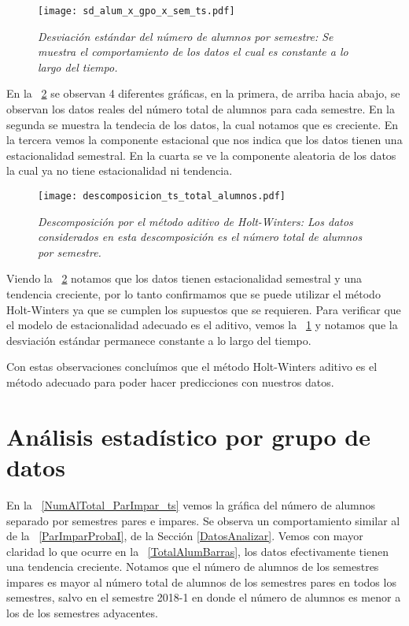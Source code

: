 \begin{figure}[H]
\centering
\texttt{[image: sd\_alum\_x\_gpo\_x\_sem\_ts.pdf]} %
\caption[\textit{Desviación estándar del número de alumnos por semestre}]{\textit{Desviación estándar del número de alumnos por semestre: Se muestra el comportamiento de los datos el cual es constante a lo largo del tiempo.}}\label{sd_alum_x_gpo_x_sem_ts}
\end{figure}

En la \figurename{~\ref{img_en_ing_2}} se observan 4 diferentes gráficas, en la primera, de arriba hacia abajo, se observan los datos reales del número total de alumnos para cada semestre. En la segunda se muestra la tendecia de los datos, la cual notamos que es creciente. En la tercera vemos la componente estacional que nos indica que los datos tienen una estacionalidad semestral. En la cuarta se ve la componente aleatoria de los datos la cual ya no tiene estacionalidad ni tendencia.

\begin{figure}[H]
\centering
\texttt{[image: descomposicion\_ts\_total\_alumnos.pdf]} %
\caption[\textit{Descomposición por el método aditivo de Holt-Winters}]{\textit{Descomposición por el método aditivo de Holt-Winters: Los datos considerados en esta descomposición es el número total de alumnos por semestre.}}\label{img_en_ing_2}
\end{figure}

Viendo la \figurename{~\ref{img_en_ing_2}} notamos que los datos tienen estacionalidad semestral y una tendencia creciente, por lo tanto confirmamos que se puede utilizar el método Holt-Winters ya que se cumplen los supuestos que se requieren. Para verificar que el modelo de estacionalidad adecuado es el aditivo, vemos la \figurename{~\ref{sd_alum_x_gpo_x_sem_ts}} y notamos que la desviación estándar permanece constante a lo largo del tiempo.

Con estas observaciones concluímos que el método Holt-Winters aditivo es el método adecuado para poder hacer predicciones con nuestros datos.

\section{Análisis estadístico por grupo de datos} \label{AE_x_GpoDeDatos}

En la \figurename{~\ref{NumAlTotal_ParImpar_ts}} vemos la gráfica del número de alumnos separado por semestres pares e impares. Se observa un comportamiento similar al de la \figurename{~\ref{ParImparProbaI}}, de la Sección \ref{DatosAnalizar}. Vemos con mayor claridad lo que ocurre en la \figurename{~\ref{TotalAlumBarras}}, los datos efectivamente tienen una tendencia creciente. Notamos que el número de alumnos de los semestres impares es mayor al número total de alumnos de los semestres pares en todos los semestres, salvo en el semestre 2018-1 en donde el número de alumnos es menor a los de los semestres adyacentes.%

